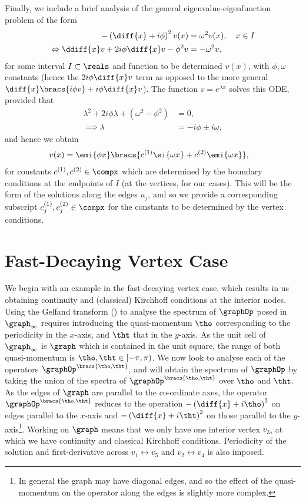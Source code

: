 Finally, we include a brief analysis of the general eigenvalue-eigenfunction problem of the form
\begin{align*}
	-\left(\diff{x} + i\phi\right)^{2}v(x) &= \omega^{2} v(x), \quad x\in I \\
	\Leftrightarrow \ddiff{x}v + 2i\phi\diff{x}v - \phi^{2}v &= -\omega^{2}v,
\end{align*}
for some interval $I\subset\reals$ and function to be determined $v(x)$, with $\phi,\omega$ constants (hence the $2i\phi\diff{x} v$ term as opposed to the more general $\diff{x}\bracs{i\phi v} + i\phi\diff{x} v$).
The function $v=e^{\lambda x}$ solves this ODE, provided that
\begin{align*}
	\lambda^{2} + 2i\phi\lambda + (\omega^{2}-\phi^{2}) &= 0, \\
	\implies \lambda &= -i\phi \pm i\omega,
\end{align*}
and hence we obtain
\begin{align} \label{eq:EdgeSolutionForm}
	v(x) &= \emi{\phi x}\bracs{ c^{(1)}\ei{\omega x} + c^{(2)}\emi{\omega x} },
\end{align}
for constants $c^{(1)},c^{(2)}\in\compx$ which are determined by the boundary conditions at the endpoints of $I$ (at the vertices, for our cases).
This will be the form of the solutions along the edges $u_{j}$, and so we provide a corresponding subscript $c_{j}^{(1)},c_{j}^{(2)}\in\compx$ for the constants to be determined by the vertex conditions.

\section{Fast-Decaying Vertex Case}	\label{sec:GraphODE}
We begin with an example in the fast-decaying vertex case, which results in us obtaining continuity and (classical) Kirchhoff conditions at the interior nodes.
Using the Gelfand transform () to analyse the spectrum of $\graphOp$ posed in $\graph_{\infty}$ requires introducing the quasi-momentum $\tho$ corresponding to the periodicity in the $x$-axis, and $\tht$ that in the $y$-axis. 
As the unit cell of $\graph_{\infty}$ is $\graph$ which is contained in the unit square, the range of both quasi-momentum is $\tho,\tht\in[-\pi,\pi)$.
We now look to analyse each of the operators $\graphOp^{\bracs{\tho,\tht}}$, and will obtain the spectrum of $\graphOp$ by taking the union of the spectra of $\graphOp^{\bracs{\tho,\tht}}$ over $\tho$ and $\tht$.
As the edges of $\graph$ are parallel to the co-ordinate axes, the operator $\graphOp^{\bracs{\tho,\tht}}$ reduces to the operation $-\left(\diff{x} + i\tho\right)^{2}$ on edges parallel to the $x$-axis and $-\left(\diff{x} + i\tht\right)^{2}$ on those parallel to the $y$-axis\footnote{In general the graph may have diagonal edges, and so the effect of the quasi-momentum on the operator along the edges is slightly more complex.}.
Working on $\graph$ means that we only have one interior vertex $v_{3}$, at which we have continuity and classical Kirchhoff conditions. 
Periodicity of the solution and first-derivative across $v_{1}\leftrightarrow v_{5}$ and $v_{2}\leftrightarrow v_{4}$ is also imposed. \newline

